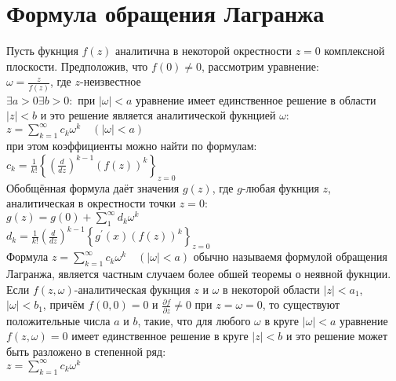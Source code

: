 \documentclass{report}
\begin{document}
\section{Формула обращения Лагранжа}
Пусть фукнция $f(z)$ аналитична в некоторой окрестности $z=0$ комплексной плоскости. Предположив, что $f(0)\neq{0}$, рассмотрим уравнение: \\
$\omega=\frac{z}{f(z)}$, где $z$-неизвестное \\
$\exists{a>0}\exists{b>0}:$ при $|\omega|<a$ уравнение имеет единственное решение в области $|z|<b$ и это решение является аналитической фукнцией $\omega$: \\
$z=\sum_{k=1}^{\infty}c_k\omega^{k}\quad(|\omega|<a)$ \\
при этом коэффициенты можно найти по формулам:
$c_k=\frac{1}{k!}\left\{\left(\frac{d}{dz}\right)^{k-1}(f(z))^{k}\right\}_{z=0}$ \\
Обобщённая формула даёт значения $g(z)$, где $g$-любая фукнция $z$, аналитическая в окрестности точки $z=0$: \\
$g(z)=g(0)+\sum_{1}^{\infty}d_k\omega^{k}$ \\
$d_k=\frac{1}{k!}{\left(\frac{d}{dz}\right)}^{k-1} \left\{g^{\prime}(x)(f(z))^{k}\right\}_{z=0}$ \\
Формула $z=\sum_{k=1}^{\infty}c_k\omega^{k}\quad(|\omega|<a)$ обычно называемя формулой обращения Лагранжа, является частным случаем более обшей теоремы о неявной фукнции. \\
Если $f(z,\omega)$-аналитическая фукнция $z$ и $\omega$ в некоторой области $|z|<a_1$, $|\omega|<b_1$, причём $f(0,0)=0$ и $\frac{\partial{f}}{\partial{z}}\neq{0}$ при $z=\omega=0$, то
существуют положительные числа $a$ и $b$, такие, что для любого $\omega$ в круге $|\omega|<a$ уравнение $f(z,\omega)=0$ имеет единственное решение в круге $|z|<b$ и это решение может быть
разложено в степенной ряд: \\
$z=\sum_{k=1}^{\infty}c_k\omega^{k}$ \newpage
\end{document}
